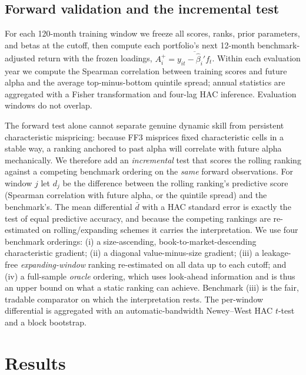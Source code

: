 \documentclass[11pt]{article}
\begin{document}
\subsection{Forward validation and the incremental test}\label{sec:incmethod}
For each 120-month training window we freeze all scores, ranks, prior
parameters, and betas at the cutoff, then compute each portfolio's next
12-month benchmark-adjusted return with the frozen loadings,
$A_i^{+}=\overline{y_{it}-\hat\beta_i'f_t}$. Within each evaluation year we
compute the Spearman correlation between training scores and future alpha and
the average top-minus-bottom quintile spread; annual statistics are aggregated
with a Fisher transformation and four-lag HAC inference. Evaluation windows do
not overlap.

The forward test alone cannot separate genuine dynamic skill from persistent
characteristic mispricing: because FF3 misprices fixed characteristic cells in a
stable way, a ranking anchored to past alpha will correlate with future alpha
mechanically. We therefore add an \emph{incremental} test that scores the
rolling ranking against a competing benchmark ordering on the \emph{same}
forward observations. For window $j$ let $d_j$ be the difference between the
rolling ranking's predictive score (Spearman correlation with future alpha, or
the quintile spread) and the benchmark's. The mean differential $\bar d$ with a
HAC standard error is exactly the \citet{DieboldMariano1995} test of equal
predictive accuracy, and because the competing rankings are re-estimated on
rolling/expanding schemes it carries the \citet{GiacominiWhite2006}
interpretation. We use four benchmark orderings: (i) a size-ascending,
book-to-market-descending characteristic gradient; (ii) a diagonal
value-minus-size gradient; (iii) a leakage-free \emph{expanding-window} ranking
re-estimated on all data up to each cutoff; and (iv) a full-sample \emph{oracle}
ordering, which uses look-ahead information and is thus an upper bound on what a
static ranking can achieve. Benchmark (iii) is the fair, tradable comparator on
which the interpretation rests. The per-window differential is aggregated with
an automatic-bandwidth Newey--West HAC $t$-test \citep{NeweyWest1994} and a
block bootstrap.

\section{Results}\label{sec:results}
\end{document}
